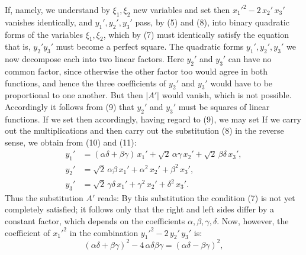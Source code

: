 
If, namely, we understand by $\xi_1, \xi_2$ new variables and set
then $x_1'^2 - 2\,x_2'\,x_3'$ vanishes identically, and
$y_1', y_2', y_3'$ pass, by (5) and (8), into binary quadratic
forms of the variables $\xi_1, \xi_2$, which by (7) must identically
satisfy the equation
that is, $y_2' y_3'$ must become a
perfect square. The quadratic forms $y_1', y_2',
y_3'$ we now decompose each into two linear factors. Here
$y_2'$ and $y_3'$ can have no common factor, since otherwise the
other factor too would agree in both functions, and hence
the three coefficients of $y_2'$ and $y_3'$ would have to be
proportional to one another. But then $|A'|$ would vanish,
which is not possible. Accordingly it follows from (9) that $y_2'$
and $y_3'$ must be squares of linear functions. If we set
then accordingly, having regard to (9), we may set
If we carry out the multiplications and then carry out the
substitution (8) in the reverse sense, we obtain
from (10) and (11):
\[
\begin{aligned}
y_1' &= (\alpha\delta + \beta\gamma)\,x_1' + \sqrt{2}\,\alpha\gamma\,x_2' + \sqrt{2}\,\beta\delta\,x_3', \\
y_2' &= \sqrt{2}\,\alpha\beta\,x_1' + \alpha^2\,x_2' + \beta^2\,x_3', \\
y_3' &= \sqrt{2}\,\gamma\delta\,x_1' + \gamma^2\,x_2' + \delta^2\,x_3'.
\end{aligned}
\]
Thus the substitution $A'$ reads:
By this substitution the condition (7) is not yet completely
satisfied; it follows only that the right and left sides
differ by a constant factor, which depends on the
coefficients $\alpha, \beta, \gamma, \delta$. Now, however, the coefficient
of $x_1'^2$ in the combination $y_1'^2 - 2\,y_2'\,y_3'$ is:
\[
(\alpha\delta + \beta\gamma)^2 - 4\,\alpha\delta\beta\gamma = (\alpha\delta - \beta\gamma)^2,
\]
